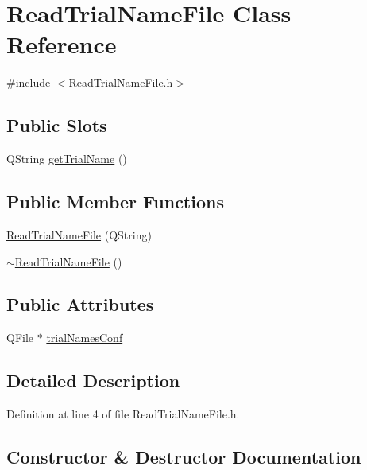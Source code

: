 \hypertarget{class_read_trial_name_file}{}\section{Read\+Trial\+Name\+File Class Reference}
\label{class_read_trial_name_file}


{\ttfamily \#include $<$Read\+Trial\+Name\+File.\+h$>$}

\subsection*{Public Slots}
\begin{DoxyCompactItemize}
\item 
Q\+String \hyperlink{class_read_trial_name_file_ac2baefe73463ab4de88b3bc4ab0fbc23}{get\+Trial\+Name} ()
\end{DoxyCompactItemize}
\subsection*{Public Member Functions}
\begin{DoxyCompactItemize}
\item 
\hyperlink{class_read_trial_name_file_ad353c985486effd89ca93fbd9fe09ee8}{Read\+Trial\+Name\+File} (Q\+String)
\item 
\hyperlink{class_read_trial_name_file_a3a8ef50b5d6b5a7a7b78133013ed020b}{$\sim$\+Read\+Trial\+Name\+File} ()
\end{DoxyCompactItemize}
\subsection*{Public Attributes}
\begin{DoxyCompactItemize}
\item 
Q\+File $\ast$ \hyperlink{class_read_trial_name_file_a8b35e16abc1e8f102a6a8ffaec80e174}{trial\+Names\+Conf}
\end{DoxyCompactItemize}


\subsection{Detailed Description}


Definition at line 4 of file Read\+Trial\+Name\+File.\+h.



\subsection{Constructor \& Destructor Documentation}
\mbox{\label{class_read_trial_name_file_ad353c985486effd89ca93fbd9fe09ee8}} 
